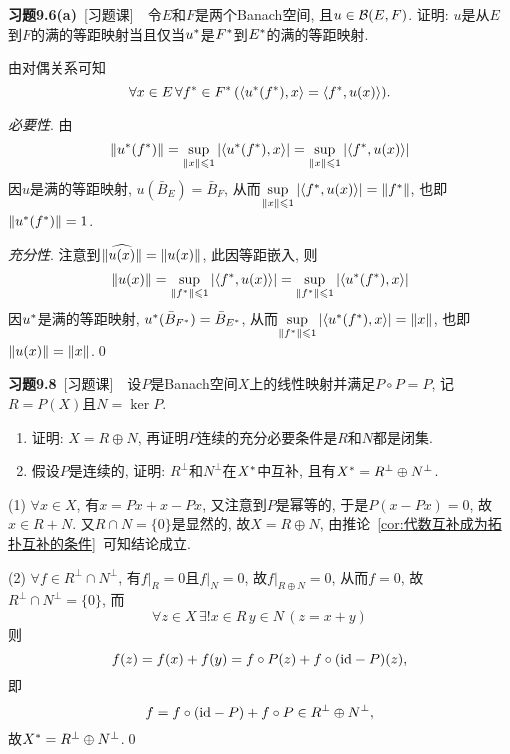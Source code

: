    \textbf{习题9.6(a)}\ [习题课]\ \ 令$ E $和$ F $是两个Banach空间, 且$ u\in\mathcal{B}(E,F) $. 证明: $ u $是从$ E $到$ F $的满的等距映射当且仅当$ u^{*} $是$ F^{*} $到$ E^{*} $的满的等距映射.
    \begin{Proof}
    由对偶关系可知
    \[
    \forall x\in E\,\forall f^{*}\in F^{*}\,(\left\langle u^{*}(f^{*}),x \right\rangle=\left\langle f^{*},u(x) \right\rangle).
    \]
    
    \textsl{必要性}. 由
    \[
    \left\| u^{*}(f^{*}) \right\|=\sup_{\left\| x \right\|\leqslant 1}\left| \left\langle u^{*}(f^{*}),x \right\rangle \right| =\sup_{\left\| x \right\|\leqslant 1}\left| \left\langle f^{*},u(x) \right\rangle \right| 
    \]
    因$ u $是满的等距映射, $ u(\bar{B}_E)=\bar{B}_F $, 从而$ \sup\limits_{\left\| x \right\|\leqslant 1}\left| \left\langle f^{*},u(x) \right\rangle \right| =\left\| f^{*} \right\| $, 也即$ \left\| u^{*}(f^{*}) \right\|=1 $.
    
    \textsl{充分性}. 注意到$ \lVert \widehat{u(x)}\rVert=\left\| u(x) \right\| $, 此因等距嵌入, 则
    \[
    \left\| u(x) \right\|=\sup_{\left\| f^{*} \right\|\leqslant 1}\left| \left\langle f^{*},u(x) \right\rangle \right| =\sup_{\left\| f^{*} \right\|\leqslant 1}\left| \left\langle u^{*}(f^{*}),x \right\rangle \right| 
    \]
    因$ u^{*} $是满的等距映射, $ u^{*}(\bar{B}_{F^{*}})=\bar{B}_{E^{*}} $, 从而$ \sup\limits_{\left\| f^{*} \right\|\leqslant 1}\left| \left\langle u^{*}(f^{*}),x \right\rangle \right| =\left\| x \right\| $, 也即$ \left\| u(x) \right\|=\left\| x \right\| $.\qed
    \end{Proof}
    
    \textbf{习题9.8}\ [习题课]\ \ 设$ P $是Banach空间$ X $上的线性映射并满足$ P\circ P=P $, 记$ R=P(X) $且$ N=\ker P $.
    \begin{enumerate}[(1)]
    \item 证明: $ X=R\oplus N $, 再证明$ P $连续的充分必要条件是$ R $和$ N $都是闭集.
    \item 假设$ P $是连续的, 证明: $ R^\bot $和$ N^\bot $在$ X^{*} $中互补, 且有$ X^{*}=R^\bot\oplus N^\bot $.
    \end{enumerate}
    \begin{Proof}
    (1) $ \forall x\in X $, 有$ x=Px+x-Px $, 又注意到$ P $是幂等的, 于是$ P(x-Px)=0 $, 故$ x\in R+N $. 又$ R\cap N=\{0\} $是显然的, 故$ X=R\oplus N $, 由推论~\ref{cor:代数互补成为拓扑互补的条件}~可知结论成立.
    
    (2) $ \forall f\in R^\bot\cap N^\bot $, 有$ f|_R=0 $且$ f|_N=0 $, 故$ f|_{R\oplus N}=0 $, 从而$ f=0 $, 故$ R^\bot\cap N^\bot =\{0\} $, 而
    \[
    \forall z\in X\,\exists!x\in R\,y\in N\,(z=x+y)
    \]
    则
    \[
    f(z)=f(x)+f(y)=f\circ P(z)+f\circ(\mathrm{id}-P)(z),
    \]
    即
    \[
    f=f\circ(\mathrm{id}-P)+f\circ P\in R^\bot\oplus N^\bot,
    \]
    故$ X^{*}=R^\bot\oplus N^\bot $.\qed
    \end{Proof}

